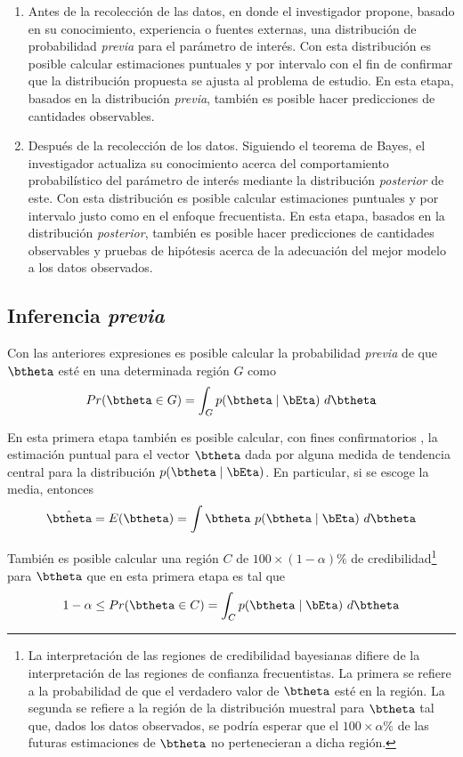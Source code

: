 \begin{enumerate}
  \item Antes de la recolección de las datos, en donde el investigador propone, basado en su conocimiento, experiencia o fuentes externas, una distribución de probabilidad \emph{previa} para el parámetro de interés. Con esta distribución es posible calcular estimaciones puntuales y por intervalo con el fin de confirmar que la distribución propuesta se ajusta al problema de estudio. En esta etapa, basados en la distribución \emph{previa}, también es posible hacer predicciones de cantidades observables.
  \item Después de la recolección de los datos. Siguiendo el teorema de Bayes, el investigador actualiza su conocimiento acerca del comportamiento probabilístico del parámetro de interés mediante la distribución \emph{posterior} de este. Con esta distribución es posible calcular estimaciones puntuales y por intervalo justo como en el enfoque frecuentista. En esta etapa, basados en la distribución \emph{posterior}, también es posible hacer predicciones de cantidades observables y pruebas de hipótesis acerca de la adecuación del mejor modelo a los datos observados.
\end{enumerate}

\subsection{Inferencia \emph{previa}}

Con las anteriores expresiones es posible calcular la probabilidad \emph{previa} de que $\btheta$ esté en una determinada región $G$ como
\begin{equation}
Pr(\btheta\in G)=\int_G p(\btheta \mid \bEta)\ d\btheta
\end{equation}

En esta primera etapa también es posible calcular, con fines confirmatorios \cite{Carlin96}, la estimación puntual para el vector $\btheta$ dada por alguna medida de tendencia central para la distribución $p(\btheta \mid \bEta)$. En particular, si se escoge la media, entonces
\begin{equation}\label{est.prio}
\hat{\btheta}=E(\btheta)=\int \btheta \ p(\btheta \mid \bEta)\ d\btheta
\end{equation}

También es posible calcular una región $C$ de $100\times(1-\alpha)\%$ de credibilidad\footnote{La interpretación de las regiones de credibilidad bayesianas difiere de la interpretación de las regiones de confianza frecuentistas. La primera se refiere a la probabilidad de que el verdadero valor de $\btheta$ esté en la región. La segunda se refiere a la región de la distribución muestral para $\btheta$ tal que, dados los datos observados, se podría esperar que el $100\times\alpha\%$ de las futuras estimaciones de $\btheta$ no pertenecieran a dicha región.} para $\btheta$ que en esta primera etapa es tal que
\begin{equation}
1-\alpha \leq Pr(\btheta \in C)=\int_Cp(\btheta \mid \bEta)\ d\btheta
\end{equation}

